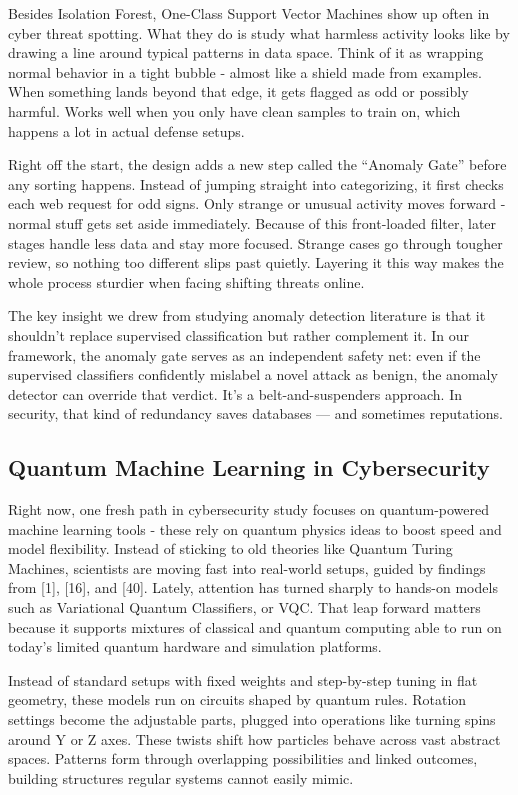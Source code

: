 \documentclass[journal,onecolumn]{IEEEtran}
\begin{document}
Besides Isolation Forest, One-Class Support Vector Machines show up often in cyber threat spotting. What they do is study what harmless activity looks like by drawing a line around typical patterns in data space. Think of it as wrapping normal behavior in a tight bubble - almost like a shield made from examples. When something lands beyond that edge, it gets flagged as odd or possibly harmful. Works well when you only have clean samples to train on, which happens a lot in actual defense setups.

Right off the start, the design adds a new step called the ``Anomaly Gate'' before any sorting happens. Instead of jumping straight into categorizing, it first checks each web request for odd signs. Only strange or unusual activity moves forward - normal stuff gets set aside immediately. Because of this front-loaded filter, later stages handle less data and stay more focused. Strange cases go through tougher review, so nothing too different slips past quietly. Layering it this way makes the whole process sturdier when facing shifting threats online.

The key insight we drew from studying anomaly detection literature is that it shouldn't replace supervised classification but rather complement it. In our framework, the anomaly gate serves as an independent safety net: even if the supervised classifiers confidently mislabel a novel attack as benign, the anomaly detector can override that verdict. It's a belt-and-suspenders approach. In security, that kind of redundancy saves databases --- and sometimes reputations.

\subsection{Quantum Machine Learning in Cybersecurity}
Right now, one fresh path in cybersecurity study focuses on quantum-powered machine learning tools - these rely on quantum physics ideas to boost speed and model flexibility. Instead of sticking to old theories like Quantum Turing Machines, scientists are moving fast into real-world setups, guided by findings from [1], [16], and [40]. Lately, attention has turned sharply to hands-on models such as Variational Quantum Classifiers, or VQC. That leap forward matters because it supports mixtures of classical and quantum computing able to run on today's limited quantum hardware and simulation platforms.

Instead of standard setups with fixed weights and step-by-step tuning in flat geometry, these models run on circuits shaped by quantum rules. Rotation settings become the adjustable parts, plugged into operations like turning spins around Y or Z axes. These twists shift how particles behave across vast abstract spaces. Patterns form through overlapping possibilities and linked outcomes, building structures regular systems cannot easily mimic.
\end{document}
